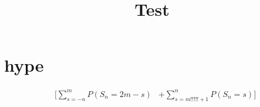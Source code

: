 \documentclass{book}
\title{
  Test
}
\begin{document}
\maketitle

\part{hype}
\begin{align}
 & \big[\sum_{s=-n}^m  P(S_n = 2m - s) &+\sum_{s=m!!!!!+1}^n P(S_n = s) \big]\\
\end{align}
\end{document}
